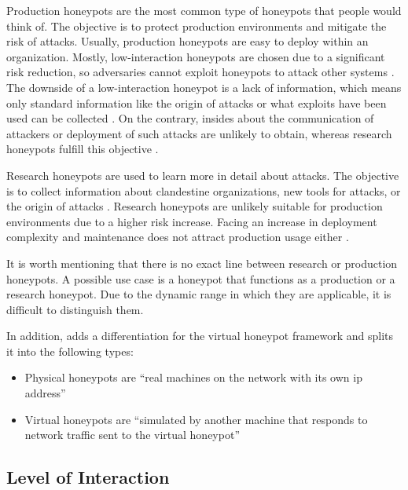 Production honeypots are the most common type of honeypots that people would think of.
The objective is to protect production environments and mitigate the risk of attacks.
Usually, production honeypots are easy to deploy within an organization.
Mostly, low-interaction honeypots are chosen due to a significant risk reduction, so adversaries cannot exploit honeypots to attack other systems \cite{Spitzner2003}.
The downside of a low-interaction honeypot is a lack of information, which means only standard information like the origin of attacks or what exploits have been used can be collected \cite{Mokube2007}.
On the contrary, insides about the communication of attackers or deployment of such attacks are unlikely to obtain, whereas research honeypots fulfill this objective \cite{Spitzner2003}.

Research honeypots are used to learn more in detail about attacks.
The objective is to collect information about clandestine organizations, new tools for attacks, or the origin of attacks \cite{Spitzner2003,Mokube2007}.
Research honeypots are unlikely suitable for production environments due to a higher risk increase.
Facing an increase in deployment complexity and maintenance does not attract production usage either \cite{Spitzner2003}.

It is worth mentioning that there is no exact line between research or production honeypots.
A possible use case is a honeypot that functions as a production or a research honeypot.
Due to the dynamic range in which they are applicable, it is difficult to distinguish them.

In addition, \citet{Provos2003} adds a differentiation for the virtual honeypot framework and splits it into the following types:

\begin{itemize}
    \item Physical honeypots are \enquote{real machines on the network with its own \ac{ip} address} \cite{Provos2003}
    \item Virtual honeypots are \enquote{simulated by another machine that responds to network traffic sent to the virtual honeypot} \cite{Provos2003}
\end{itemize}

\subsection{Level of Interaction}
\label{subsec:interaction-honeypots}

